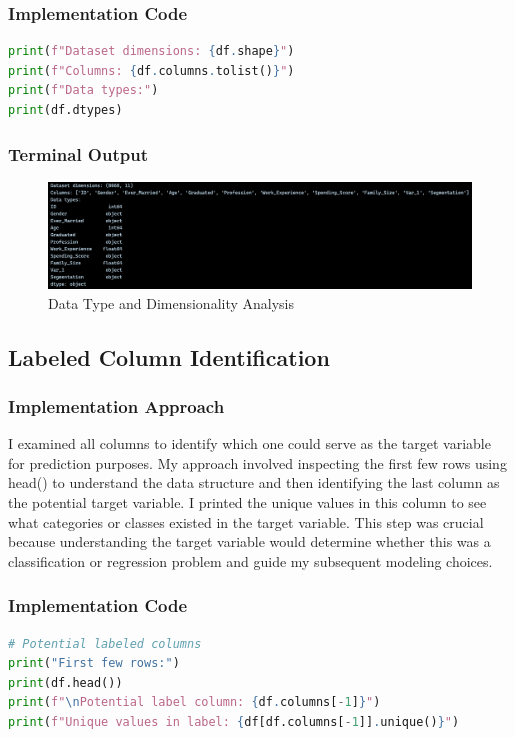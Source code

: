\documentclass[12pt,a4paper]{article}
\begin{document}
\subsubsection{Implementation Code}
\begin{lstlisting}[language=Python, caption=Data Type Analysis and Dimension Determination]
print(f"Dataset dimensions: {df.shape}")
print(f"Columns: {df.columns.tolist()}")
print(f"Data types:")
print(df.dtypes)
\end{lstlisting}

\subsubsection{Terminal Output}

\begin{figure}[h!]
\centering
    \includegraphics[width=\textwidth]{Figures/dataset_info_summary.png}
    \caption{Data Type and Dimensionality Analysis}
    \label{fig:dataset_info}
\end{figure}

\subsection{Labeled Column Identification}

\subsubsection{Implementation Approach}
I examined all columns to identify which one could serve as the target variable for prediction purposes. My approach involved inspecting the first few rows using head() to understand the data structure and then identifying the last column as the potential target variable. I printed the unique values in this column to see what categories or classes existed in the target variable. This step was crucial because understanding the target variable would determine whether this was a classification or regression problem and guide my subsequent modeling choices.

\subsubsection{Implementation Code}
\begin{lstlisting}[language=Python, caption=Labeled Column Identification]
# Potential labeled columns
print("First few rows:")
print(df.head())
print(f"\nPotential label column: {df.columns[-1]}")
print(f"Unique values in label: {df[df.columns[-1]].unique()}")
\end{lstlisting}
\end{document}
